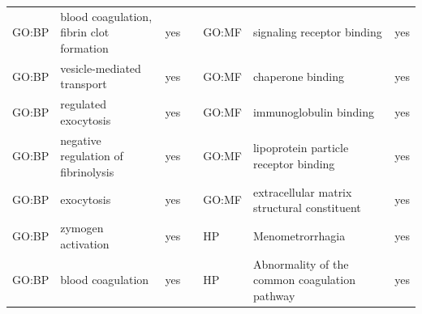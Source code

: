 \begin{longtable}{@{}lp{5cm}lllp{5cm}l@{}}
GO:BP           & blood coagulation, fibrin clot formation                                                                                           & yes              &           & GO:MF           & signaling receptor binding                                                                                                                                             & yes              \\
GO:BP           & vesicle-mediated transport                                                                                                         & yes              &           & GO:MF           & chaperone binding                                                                                                                                                      & yes              \\
GO:BP           & regulated exocytosis                                                                                                               & yes              &           & GO:MF           & immunoglobulin binding                                                                                                                                                 & yes              \\
GO:BP           & negative regulation of fibrinolysis                                                                                                & yes              &           & GO:MF           & lipoprotein particle receptor binding                                                                                                                                  & yes              \\
GO:BP           & exocytosis                                                                                                                         & yes              &           & GO:MF           & extracellular matrix structural constituent                                                                                                                            & yes              \\
GO:BP           & zymogen activation                                                                                                                 & yes              &           & HP              & Menometrorrhagia                                                                                                                                                       & yes              \\
GO:BP           & blood coagulation                                                                                                                  & yes              &           & HP              & Abnormality of the common coagulation pathway                                                                                                                          & yes              \\

\end{longtable}
